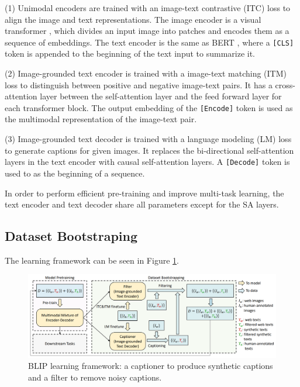 \documentclass[11pt]{article}
\begin{document}
(1) Unimodal encoders are trained with an image-text contrastive (ITC) loss to align the image and text representations. The image encoder is a visual transformer \cite{dosovitskiy2020image}, which divides an input image into patches and encodes them as a sequence of embeddings. The text encoder is the same as BERT \cite{devlin2018bert}, where a \texttt{[CLS]} token is appended to the beginning of the text input to summarize it.

(2) Image-grounded text encoder is trained with a image-text matching (ITM) loss to distinguish between positive and negative image-text pairs. It has a cross-attention layer between the self-attention layer and the feed forward layer for each transformer block. The output embedding of the \texttt{[Encode]} token is used as the multimodal representation of the image-text pair.

(3) Image-grounded text decoder is trained with a language modeling (LM) loss to generate captions for given images. It replaces the bi-directional self-attention layers in the text encoder with causal self-attention layers. A \texttt{[Decode]} token is used to as the beginning of a sequence.

In order to perform efficient pre-training and improve multi-task learning, the text encoder and text decoder share all parameters except for the SA layers.

\subsection{Dataset Bootstraping}

The learning framework can be seen in Figure \ref{fig:blip_framework}.

\begin{figure}
    \centering
    \includegraphics[width=\linewidth]{blip_framework.png}
    \caption{BLIP learning framework: a captioner to produce synthetic captions and a filter to remove noisy captions.}
    \label{fig:blip_framework}
\end{figure}
\end{document}
